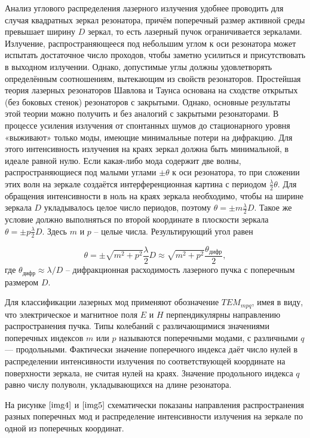 \documentclass[a4paper,12pt]{article} %
\begin{document}
Анализ углового распределения лазерного излучения удобнее проводить для случая квадратных зеркал резонатора, причём поперечный размер активной среды превышает ширину $D$ зеркал, то есть лазерный пучок ограничивается зеркалами. Излучение, распространяющееся под небольшим углом к оси резонатора может испытать достаточное число проходов, чтобы заметно усилиться и присутствовать в выходном излучении. Однако, допустимые углы должны удовлетворять определённым соотношениям, вытекающим из свойств резонаторов. Простейшая теория лазерных резонаторов Шавлова и Таунса основана на сходстве открытых (без боковых стенок) резонаторов с закрытыми. Однако, основные
результаты этой теории можно получить и без аналогий с закрытыми резонаторами. В процессе усиления излучения от спонтанных шумов до стационарного уровня «выживают» только моды, имеющие минимальные потери на дифракцию. Для этого интенсивность излучения на краях зеркал должна быть минимальной, в идеале равной нулю. Если какая-либо мода содержит две волны, распространяющиеся под малыми углами $\pm\theta$ к оси резонатора, то при сложении этих волн на зеркале создаётся интерференционная картина с периодом $\frac{\lambda}{2}\theta$. Для обращения интенсивности в ноль на краях зеркала необходимо, чтобы на ширине зеркала $D$ укладывалось целое число периодов, поэтому $\theta=\pm m\frac{\lambda}{2}D$. Такое же условие должно выполняться по второй
координате в плоскости зеркала $\theta=\pm p\frac{\lambda}{2}D$. Здесь $m$ и $p$ -- целые числа. Результирующий угол равен

\[ \theta=\pm\sqrt{m^2+p^2}\frac{\lambda}{2}D\approx\sqrt{m^2+p^2}\frac{\theta_{\text{дифр}}}{2}, \]
где $\theta_{\text{дифр}}\approx\lambda/D$ -- дифракционная расходимость лазерного пучка с поперечным размером $D$.

Для классификации лазерных мод применяют обозначение $TEM_{mpq}$, имея в виду, что электрическое и магнитное поля $E$ и $H$ перпендикулярны направлению распространения пучка. Типы колебаний с различающимися значениями поперечных индексов $m$ или $p$ называются поперечными модами, с различными $q$ — продольными. Фактически значение поперечного индекса даёт число нулей в распределении интенсивности излучения по соответствующей координате на поверхности зеркала, не считая нулей на краях. Значение продольного индекса $q$ равно числу полуволн, укладывающихся на длине резонатора.

На рисунке $\ref{img4}$ и $\ref{img5}$ схематически показаны направления распространения разных поперечных мод и распределение интенсивности излучения на зеркале по одной из поперечных координат.
\end{document}
